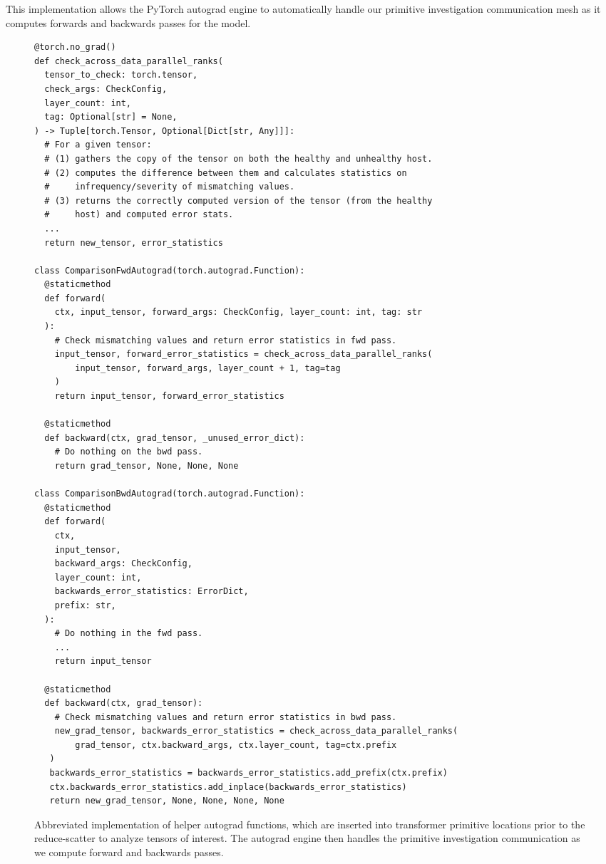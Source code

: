 This implementation allows the PyTorch autograd engine to automatically handle our primitive investigation communication mesh as it computes forwards and backwards passes for the model.

\begin{figure*}[htbp]
    \begin{longfbox}[title=Autograd Implementation]{}
    \begin{small}
    \begin{verbatim}
@torch.no_grad()
def check_across_data_parallel_ranks(
  tensor_to_check: torch.tensor,
  check_args: CheckConfig,
  layer_count: int,
  tag: Optional[str] = None,
) -> Tuple[torch.Tensor, Optional[Dict[str, Any]]]:
  # For a given tensor:
  # (1) gathers the copy of the tensor on both the healthy and unhealthy host.
  # (2) computes the difference between them and calculates statistics on 
  #     infrequency/severity of mismatching values.
  # (3) returns the correctly computed version of the tensor (from the healthy 
  #     host) and computed error stats.
  ...
  return new_tensor, error_statistics

class ComparisonFwdAutograd(torch.autograd.Function):
  @staticmethod
  def forward(
    ctx, input_tensor, forward_args: CheckConfig, layer_count: int, tag: str
  ):
    # Check mismatching values and return error statistics in fwd pass.
    input_tensor, forward_error_statistics = check_across_data_parallel_ranks(
        input_tensor, forward_args, layer_count + 1, tag=tag
    )
    return input_tensor, forward_error_statistics

  @staticmethod
  def backward(ctx, grad_tensor, _unused_error_dict):
    # Do nothing on the bwd pass.
    return grad_tensor, None, None, None

class ComparisonBwdAutograd(torch.autograd.Function):
  @staticmethod
  def forward(
    ctx,
    input_tensor,
    backward_args: CheckConfig,
    layer_count: int,
    backwards_error_statistics: ErrorDict,
    prefix: str,
  ):
    # Do nothing in the fwd pass.
    ...
    return input_tensor

  @staticmethod
  def backward(ctx, grad_tensor):
    # Check mismatching values and return error statistics in bwd pass.
    new_grad_tensor, backwards_error_statistics = check_across_data_parallel_ranks(
        grad_tensor, ctx.backward_args, ctx.layer_count, tag=ctx.prefix
   )
   backwards_error_statistics = backwards_error_statistics.add_prefix(ctx.prefix)
   ctx.backwards_error_statistics.add_inplace(backwards_error_statistics)
   return new_grad_tensor, None, None, None, None
\end{verbatim}
    \end{small}
    \end{longfbox}
    \caption{Abbreviated implementation of helper autograd functions, which are inserted into transformer primitive locations prior to the reduce-scatter to analyze tensors of interest. The autograd engine then handles the primitive investigation communication as we compute forward and backwards passes.}
    \label{fig:auto_grad_implementation}
\end{figure*}


